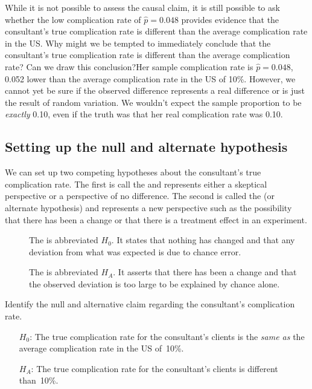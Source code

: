 \begin{example}{
While it is not possible to assess the causal claim, it is still possible to ask whether the low complication rate of $\hat{p} = 0.048$ provides evidence that the consultant's true complication rate is different than the average complication rate in the US. Why might we be tempted to immediately conclude that the consultant's true complication rate is different than the average complication rate? Can we draw this conclusion?}Her sample complication rate is $\hat{p} = 0.048$, 0.052 lower than the average complication rate in the US of 10\%. However, we cannot yet be sure if the observed difference represents a real difference or is just the result of random variation. We wouldn't expect the sample proportion to be \emph{exactly} 0.10, even if the truth was that her real complication rate was 0.10.
\end{example}


\subsection{Setting up the null and alternate hypothesis}

We can set up two competing hypotheses about the consultant's true complication rate. The first is call the  and represents either a skeptical perspective or a perspective of no difference. The second is called the  (or alternate hypothesis) and represents a new perspective such as the possibility that there has been a change or that there is a treatment effect in an experiment.

\begin{termBox}{
\vspace{-5mm}
\begin{description}
\item[] The  is abbreviated $H_0$. It states that nothing has changed and that any deviation from what was expected is due to chance error.
\item[] The  is abbreviated $H_A$. It asserts that there has been a change and that the observed deviation is too large to be explained by chance alone.
\end{description}}
\end{termBox}

\begin{example}{Identify the null and alternative claim regarding the consultant's complication rate.}
\begin{itemize}
\item[$H_0$:] The true complication rate for the consultant's clients is the \emph{same as} the average complication rate in the US of~10\%.
\item[$H_A$:] The true complication rate for the consultant's clients is different than~10\%.
\end{itemize}
\end{example}

